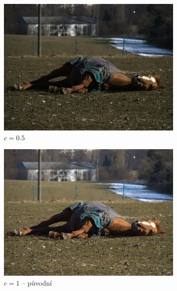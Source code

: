 \documentclass[11pt, a4paper, titlepage]{article}
\begin{document}
\begin{figure}[h]
    \centering
    \begin{subfigure}[t]{0.25\textwidth}
        \vskip 0pt
        \includegraphics[width=1.0\textwidth]{horse_mul_luma_down.jpg}
        \caption{$c = 0.5$}
    \end{subfigure}
    \hspace{1cm}
    \begin{subfigure}[t]{0.25\textwidth}
        \vskip 0pt
        \includegraphics[width=1.0\textwidth]{horse_original.jpg}
        \caption{$c = 1$ -- původní}
    \end{subfigure}
    \hspace{1cm}
    \begin{subfigure}[t]{0.25\textwidth}

\end{subfigure}
\end{figure}
\end{document}
